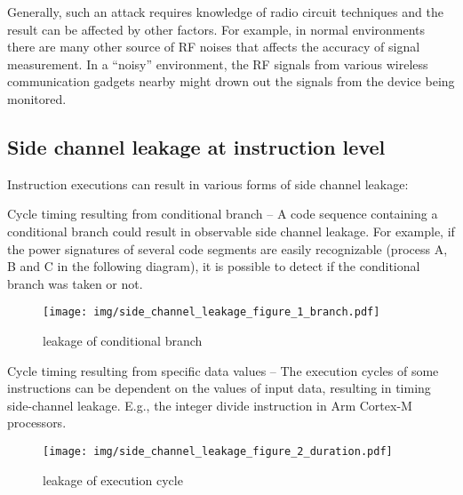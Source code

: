 \documentclass[a4paper,]{report}
\makeatletter
\newcounter{figno}
\newenvironment{fignos:no-prefix-figure-caption}{
  \caption@ifcompatibility{}{
    \let\oldthefigure\thefigure
    \let\oldtheHfigure\theHfigure
    \renewcommand{\thefigure}{figno:\thefigno}
    \renewcommand{\theHfigure}{figno:\thefigno}
    \stepcounter{figno}
    \captionsetup{labelformat=empty}
  }
}{
  \caption@ifcompatibility{}{
    \captionsetup{labelformat=default}
    \let\thefigure\oldthefigure
    \let\theHfigure\oldtheHfigure
    \addtocounter{figure}{-1}
  }
}
\makeatother
\begin{document}
Generally, such an attack requires knowledge of radio circuit techniques
and the result can be affected by other factors. For example, in normal
environments there are many other source of RF noises that affects the
accuracy of signal measurement. In a ``noisy'' environment, the RF
signals from various wireless communication gadgets nearby might drown
out the signals from the device being monitored.

\hypertarget{side-channel-leakage-at-instruction-level}{%
\subsection{Side channel leakage at instruction
level}\label{side-channel-leakage-at-instruction-level}}

Instruction executions can result in various forms of side channel
leakage:

Cycle timing resulting from conditional branch -- A code sequence
containing a conditional branch could result in observable side channel
leakage. For example, if the power signatures of several code segments
are easily recognizable (process A, B and C in the following diagram),
it is possible to detect if the conditional branch was taken or not.

\begin{fignos:no-prefix-figure-caption}

\begin{figure}
\centering
\texttt{[image: img/side\_channel\_leakage\_figure\_1\_branch.pdf]}
\caption{leakage of conditional branch}
\end{figure}

\end{fignos:no-prefix-figure-caption}

Cycle timing resulting from specific data values -- The execution cycles
of some instructions can be dependent on the values of input data,
resulting in timing side-channel leakage. E.g., the integer divide
instruction in Arm Cortex-M processors.

\begin{fignos:no-prefix-figure-caption}

\begin{figure}
\centering
\texttt{[image: img/side\_channel\_leakage\_figure\_2\_duration.pdf]}
\caption{leakage of execution cycle}
\end{figure}

\end{fignos:no-prefix-figure-caption}
\end{document}
